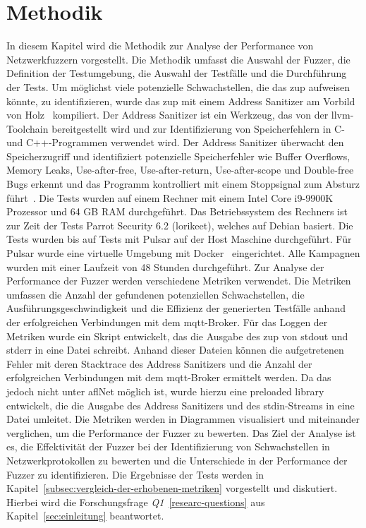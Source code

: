 
\section{Methodik}\label{sec:methodology}
In diesem Kapitel wird die Methodik zur Analyse der Performance von Netzwerkfuzzern vorgestellt.
Die Methodik umfasst die Auswahl der Fuzzer, die Definition der Testumgebung, die Auswahl der Testfälle und die
Durchführung der Tests.\newline\newline
Um möglichst viele potenzielle Schwachstellen, die das \gls{zup} aufweisen könnte, zu identifizieren, wurde das
\gls{zup} mit einem Address Sanitizer am Vorbild von Holz~\cite{mutuation-analysis} kompiliert.
Der Address Sanitizer ist ein Werkzeug, das von der llvm-Toolchain bereitgestellt wird und zur Identifizierung von
Speicherfehlern in C- und C++-Programmen verwendet wird.
Der Address Sanitizer überwacht den Speicherzugriff und identifiziert potenzielle Speicherfehler wie Buffer Overflows,
Memory Leaks, Use-after-free, Use-after-return, Use-after-scope und Double-free Bugs erkennt und das Programm kontrolliert
mit einem Stoppsignal zum Absturz führt~\cite{asan}.\newline
Die Tests wurden auf einem Rechner mit einem Intel Core i9-9900K Prozessor und 64 GB RAM durchgeführt.
Das Betriebssystem des Rechners ist zur Zeit der Tests Parrot Security 6.2 (lorikeet), welches auf Debian basiert.
Die Tests wurden bis auf Tests mit Pulsar auf der Host Maschine durchgeführt.
Für Pulsar wurde eine virtuelle Umgebung mit Docker~\cite{pulsar-docker} eingerichtet.\newline\newline
Alle Kampagnen wurden mit einer Laufzeit von 48 Stunden durchgeführt.
Zur Analyse der Performance der Fuzzer werden verschiedene Metriken verwendet.
Die Metriken umfassen die Anzahl der gefundenen potenziellen Schwachstellen, die Ausführungsgeschwindigkeit und die
Effizienz der generierten Testfälle anhand der erfolgreichen Verbindungen mit dem \gls{mqtt}-Broker.
Für das Loggen der Metriken wurde ein Skript entwickelt, das die Ausgabe des \gls{zup} von stdout und stderr in eine Datei
schreibt.
Anhand dieser Dateien können die aufgetretenen Fehler mit deren Stacktrace des Address Sanitizers und die Anzahl der erfolgreichen
Verbindungen mit dem \gls{mqtt}-Broker ermittelt werden.
Da das jedoch nicht unter \gls{afl}Net möglich ist, wurde hierzu eine preloaded library entwickelt, die die Ausgabe des
Address Sanitizers und des stdin-Streams in eine Datei umleitet.
Die Metriken werden in Diagrammen visualisiert und miteinander verglichen, um die Performance der Fuzzer zu bewerten.
Das Ziel der Analyse ist es, die Effektivität der Fuzzer bei der Identifizierung von Schwachstellen in Netzwerkprotokollen
zu bewerten und die Unterschiede in der Performance der Fuzzer zu identifizieren.
Die Ergebnisse der Tests werden in Kapitel~\ref{subsec:vergleich-der-erhobenen-metriken} vorgestellt und diskutiert.
Hierbei wird die Forschungsfrage \textit{Q1}~\ref{researc-questions} aus Kapitel~\ref{sec:einleitung} beantwortet.